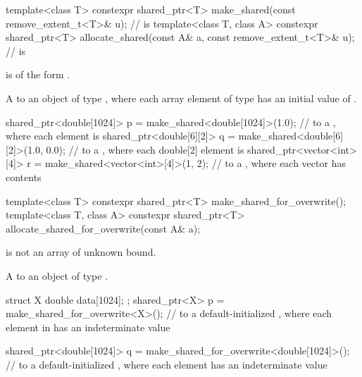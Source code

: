 %
%
\begin{itemdecl}
template<class T>
  constexpr shared_ptr<T> make_shared(const remove_extent_t<T>& u);       //  is 
template<class T, class A>
  constexpr shared_ptr<T> allocate_shared(const A& a,
                                          const remove_extent_t<T>& u);   //  is 
\end{itemdecl}

\begin{itemdescr}
\pnum
\constraints
{} is of the form .

\pnum
\returns
A  to an object of type ,
where each array element of type 
has an initial value of .

\pnum
\begin{example}
\begin{codeblock}
shared_ptr<double[1024]> p = make_shared<double[1024]>(1.0);
  //  to a , where each element is 
shared_ptr<double[6][2]> q = make_shared<double[6][2]>({1.0, 0.0});
  //  to a , where each double[2] element is 
shared_ptr<vector<int>[4]> r = make_shared<vector<int>[4]>({1, 2});
  //  to a , where each vector has contents 
\end{codeblock}
\end{example}
\end{itemdescr}

%
%
\begin{itemdecl}
template<class T>
  constexpr shared_ptr<T> make_shared_for_overwrite();
template<class T, class A>
  constexpr shared_ptr<T> allocate_shared_for_overwrite(const A& a);
\end{itemdecl}

\begin{itemdescr}
\pnum
\constraints
{} is not an array of unknown bound.

\pnum
\returns
A  to an object of type .

\pnum
\begin{example}
\begin{codeblock}
struct X { double data[1024]; };
shared_ptr<X> p = make_shared_for_overwrite<X>();
  //  to a default-initialized , where each element in  has an indeterminate value

shared_ptr<double[1024]> q = make_shared_for_overwrite<double[1024]>();
  //  to a default-initialized , where each element has an indeterminate value
\end{codeblock}
\end{example}
\end{itemdescr}

